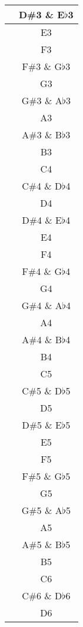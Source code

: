 \documentclass[twoside]{article}
\newcounter{rownumber}
\begin{document}
\begin{center}
\begin{supertabular}{>{\therownumber} c c}
     \hline
     & D\#3 \& E$\flat$3  \\ 
     \hline
     & E3 \\ 
     \hline
     & F3 \\ 
     \hline
     & F\#3 \& G$\flat$3 \\ 
     \hline
     & G3 \\ 
     \hline
     & G\#3 \& A$\flat$3 \\ 
     \hline
     & A3 \\ 
     \hline
     & A\#3 \& B$\flat$3 \\ 
     \hline
     & B3 \\ 
     \hline
     & C4 \\ 
     \hline
     & C\#4 \& D$\flat$4  \\ 
     \hline
     & D4  \\ 
     \hline
     & D\#4 \& E$\flat$4  \\ 
     \hline
     & E4 \\ 
     \hline
     & F4 \\ 
     \hline
     & F\#4 \& G$\flat$4 \\ 
     \hline
     & G4 \\ 
     \hline
     & G\#4 \& A$\flat$4 \\ 
     \hline
     & A4 \\ 
     \hline
     & A\#4 \& B$\flat$4 \\ 
     \hline
     & B4 \\
     \hline
     & C5 \\ 
     \hline
     & C\#5 \& D$\flat$5   \\ 
     \hline
     & D5  \\ 
     \hline
     & D\#5 \& E$\flat$5   \\ 
     \hline
     & E5 \\ 
     \hline
     & F5 \\ 
     \hline
     & F\#5 \& G$\flat$5  \\ 
     \hline
     & G5 \\ 
     \hline
     & G\#5 \& A$\flat$5  \\ 
     \hline
     & A5 \\ 
     \hline
     & A\#5 \& B$\flat$5  \\ 
     \hline
     & B5 \\
     \hline
     & C6 \\ 
     \hline
     & C\#6 \& D$\flat$6  \\ 
     \hline
     & D6  \\ 

\end{supertabular}
\end{center}
\end{document}
